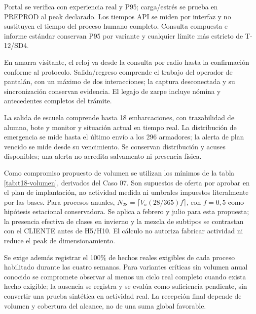 Portal se verifica con experiencia real y P95; carga/estrés se prueba en PREPROD al peak declarado. Los tiempos API se miden por interfaz y no sustituyen el tiempo del proceso humano completo. Consulta compuesta e informe estándar conservan P95 por variante y cualquier límite más estricto de T-12/SD4.

En amarra visitante, el reloj va desde la consulta por radio hasta la confirmación conforme al protocolo. Salida/regreso comprende el trabajo del operador de pantalán, con un máximo de dos interacciones; la captura desconectada y su sincronización conservan evidencia. El legajo de zarpe incluye nómina y antecedentes completos del trámite.

La salida de escuela comprende hasta 18 embarcaciones, con trazabilidad de alumno, bote y monitor y situación actual en tiempo real. La distribución de emergencia se mide hasta el último envío a los 296 armadores; la alerta de plan vencido se mide desde su vencimiento. Se conservan distribución y acuses disponibles; una alerta no acredita salvamento ni presencia física.


Como compromiso propuesto de volumen se utilizan los mínimos de la tabla \ref{tab:t18-volumen}, derivados del Caso 07. Son supuestos de oferta por aprobar en el plan de implantación, no actividad medida ni umbrales impuestos literalmente por las bases. Para procesos anuales, $N_{28}=\lceil V_a(28/365)f\rceil$, con $f=0{,}5$ como hipótesis estacional conservadora. Se aplica a febrero y julio para esta propuesta; la presencia efectiva de clases en invierno y la mezcla de subtipos se contrastan con el CLIENTE antes de H5/H10. El cálculo no autoriza fabricar actividad ni reduce el peak de dimensionamiento.

Se exige además registrar el 100\% de hechos reales exigibles de cada proceso habilitado durante las cuatro semanas. Para variantes críticas sin volumen anual conocido se compromete observar al menos un ciclo real completo cuando exista hecho exigible; la ausencia se registra y se evalúa como suficiencia pendiente, sin convertir una prueba sintética en actividad real. La recepción final depende de volumen y cobertura del alcance, no de una suma global favorable.

